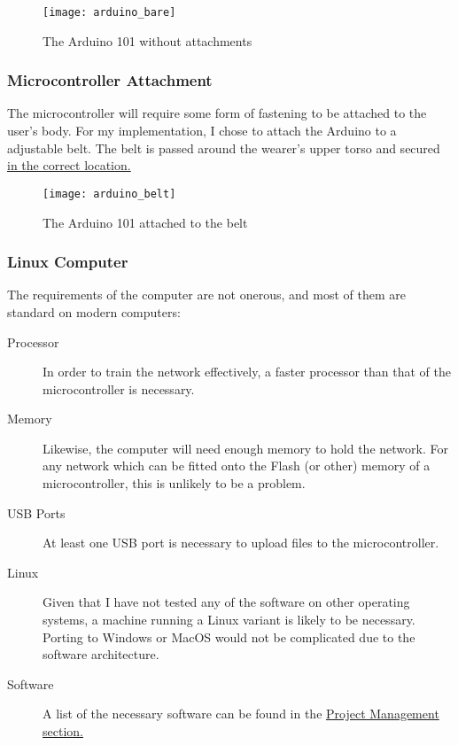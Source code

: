 \documentclass[a4paper]{article}
\begin{document}
\begin{figure}[H]
    \centering
        \texttt{[image: arduino\_bare]}
        \caption{The Arduino 101 without attachments}
        \label{fig:ar_bare}
\end{figure}

\subsubsection{Microcontroller Attachment}

The microcontroller will require some form of fastening to be attached to the user's body. For my implementation, I chose to attach the Arduino to a adjustable belt. The belt is passed around the wearer's upper torso and secured \hyperref[subsubsec:dc_dc_placement]{in the correct location.}

\begin{figure}[H]
    \centering
        \texttt{[image: arduino\_belt]}
        \caption{The Arduino 101 attached to the belt}
        \label{fig:ar_belt}
\end{figure}

\subsubsection{Linux Computer}

The requirements of the computer are not onerous, and most of them are standard on modern computers:

\begin{description}
\item[Processor] In order to train the network effectively, a faster processor than that of the microcontroller is necessary. 
\item[Memory] Likewise, the computer will need enough memory to hold the network. For any network which can be fitted onto the Flash (or other) memory of a microcontroller, this is unlikely to be a problem.
\item[USB Ports] At least one USB port is necessary to upload files to the microcontroller.
\item[Linux] Given that I have not tested any of the software on other operating systems, a machine running a Linux variant is likely to be necessary. Porting to Windows or MacOS would not be complicated due to the software architecture.
\item[Software] A list of the necessary software can be found in the \hyperref[subsec:pp_ll]{Project Management section.}
\end{description}
\end{document}
